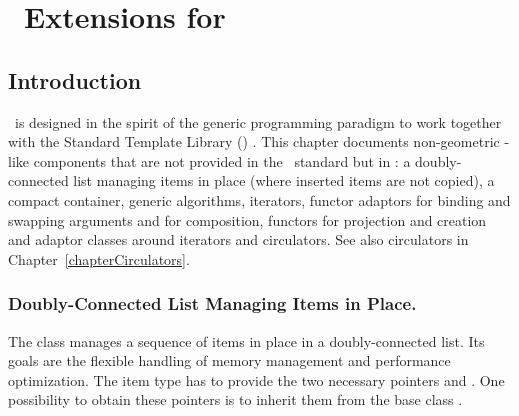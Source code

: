 
\chapter{\stl\ Extensions for \cgal}
\label{chapterDataStructures}\label{chapterStlExtensions}



\section*{Introduction}

\cgal\ is designed in the spirit of the generic programming paradigm
to work together with the Standard Template Library (\stl)
\cite{ansi-is14882,a-gps-98}. This chapter documents non-geometric
\stl-like components that are not provided in the \stl\ standard but
in \cgal: a doubly-connected list managing items in place (where
inserted items are not copied), a compact container, generic algorithms,
iterators, functor
adaptors for binding and swapping arguments and for composition,
functors for projection and creation and adaptor classes around
iterators and circulators. See also circulators in
Chapter~\ref{chapterCirculators}.

\subsection*{Doubly-Connected List Managing Items in Place.}

The class  manages a
sequence of items in place in a doubly-connected list. Its goals are
the flexible handling of memory management and performance
optimization. The item type has to provide the two necessary
pointers  and . One possibility
to obtain these pointers is to inherit them from the base class
.

